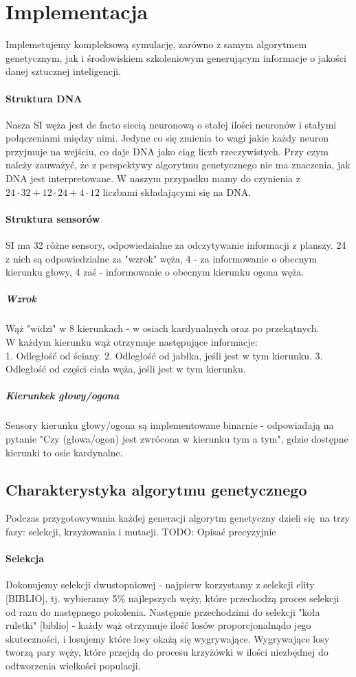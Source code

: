 \documentclass{article}
\begin{document}
\section{Implementacja}
Implemetujemy kompleksową symulację, zarówno z samym algorytmem genetycznym, jak i środowiskiem szkoleniowym generującym informacje o jakości danej sztucznej inteligencji.
\paragraph{Struktura DNA}
Nasza SI węża jest de facto siecią neuronową o stałej ilości neuronów i stałymi połączeniami między nimi. 
Jedyne co się zmienia to wagi jakie każdy neuron przyjmuje na wejściu, co daje DNA jako ciąg liczb rzeczywistych.
Przy czym należy zauważyć, że z perspektywy algorytmu genetycznego nie ma znaczenia, jak DNA jest interpretowane.
W naszym przypadku mamy do czynienia z $24\cdot32+12\cdot24+4\cdot12$ liczbami składającymi się na DNA.
\paragraph{Struktura sensorów}
SI ma 32 różne sensory, odpowiedzialne za odczytywanie informacji z planszy.
24 z nich są odpowiedzialne za "wzrok" węża, 4 - za informowanie o obecnym kierunku głowy, 4 zaś - informowanie o obecnym kierunku ogona węża.
\subparagraph{Wzrok}
Wąż "widzi" w 8 kierunkach - w osiach kardynalnych oraz po przekątnych. \\
W każdym kierunku wąż otrzymuje następujące informacje: \\
1. Odległość od ściany.
2. Odległość od jabłka, jeśli jest w tym kierunku. 
3. Odległość od części ciała węża, jeśli jest w tym kierunku.
\subparagraph{Kierunkek głowy/ogona}
Sensory kierunku głowy/ogona są implementowane binarnie - odpowiadają na pytanie "Czy (głowa/ogon) jest zwrócona w kierunku tym a tym", gdzie dostępne kierunki to osie kardynalne.
\subsection{Charakterystyka algorytmu genetycznego}
Podczas przygotowywania każdej generacji algorytm genetyczny dzieli się na trzy fazy: selekcji, krzyżowania i mutacji.
TODO: Opisać precyzyjnie
\paragraph{Selekcja}
Dokonujemy selekcji dwustopniowej - najpierw korzystamy z selekcji elity [BIBLIO], tj. wybieramy 5\% najlepszych węży, które przechodzą proces selekcji od razu do następnego pokolenia.
Następnie przechodzimi do selekcji "koła ruletki" [biblio] - każdy wąż otrzymuje ilość losów proporcjonalnądo jego skuteczności, i losujemy które losy okażą się wygrywające.
Wygrywające losy tworzą pary węży, które przejdą do procesu krzyżówki w ilości niezbędnej do odtworzenia wielkości populacji.
\end{document}
